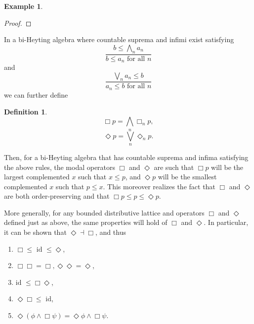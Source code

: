 \documentclass[a4paper]{book}
\theoremstyle{definition}
\newtheorem{example}{Example}[section]
\theoremstyle{definition}
\newtheorem{definition}{Definition}[section]
\theoremstyle{definition}
\theoremstyle{theorem}
\theoremstyle{definition}
\begin{document}
\begin{example}
\begin{proof}
	\end{proof}
	In a bi-Heyting algebra where countable suprema and infimi exist satisfying 
	\begin{equation*}
	\frac{b \leq \bigwedge_n a_n}{b \leq a_n \text{ for all } n}
	\end{equation*}
	and 
	\begin{equation*}
	\frac{\bigvee_n a_n \leq b}{a_n \leq b \text{ for all } n}
	\end{equation*}
	we can further define 
	\begin{definition}
		\begin{equation}
		\Box p = \bigwedge_n \Box_n p, 
		\end{equation}
		\begin{equation}
		\Diamond p = \bigvee_n \Diamond_n p. 
		\end{equation}
	\end{definition} \par 
	Then, for a bi-Heyting algebra that has countable suprema and infima satisfying the above rules, the modal operators $\Box$ and $\Diamond$ are such that $\Box p$ will be the largest complemented $x$ such that $x \leq p$, and $\Diamond p$ will be the smallest complemented $x$ such that $p \leq x$. This moreover realizes the fact that $\Box$ and $\Diamond$ are both order-preserving and that $\Box p \leq p \leq \Diamond p$.\par 
	More generally, for any bounded distributive lattice and operators $\Box$ and $\Diamond$ defined just as above, the same properties will hold of $\Box$ and $\Diamond$. In particular, it can be shown that $\Diamond \dashv \Box$, and thus
	\label{5 inequalities}
	\begin{enumerate}
		\item $\Box \leq \text{ id } \leq \Diamond$,
		\item $\Box \Box  = \Box , \Diamond \Diamond = \Diamond$, 
		\item $\text{id } \leq \Box \Diamond$, 
		\item $\Diamond \Box \leq \text{ id}$,
		\item $\Diamond (\phi \wedge \Box \psi) = \Diamond \phi \wedge \Box \psi$. 
	\end{enumerate}

\end{example}
\end{document}
